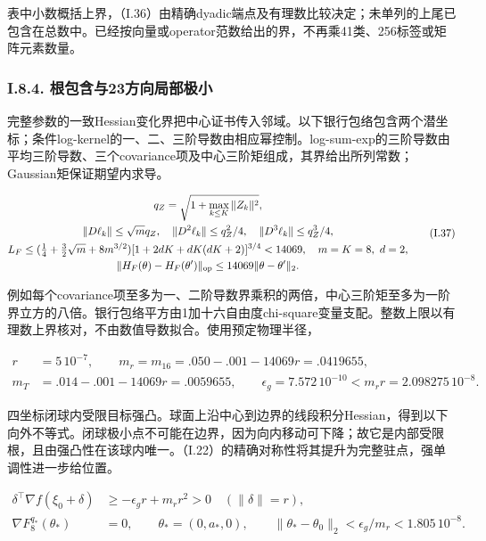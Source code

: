 \documentclass[11pt,a4paper]{article}
\begin{document}
表中小数概括上界，（I.36）由精确dyadic端点及有理数比较决定；未单列的上尾已包含在总数中。已经按向量或operator范数给出的界，不再乘41类、256标签或矩阵元素数量。

\subsubsection*{I.8.4.
根包含与23方向局部极小}\label{i.8.4.-ux6839ux5305ux542bux4e0e23ux65b9ux5411ux5c40ux90e8ux6781ux5c0f}

完整参数的一致Hessian变化界把中心证书传入邻域。以下银行包络包含两个潜坐标；条件log-kernel的一、二、三阶导数由相应幂控制。log-sum-exp的三阶导数由平均三阶导数、三个covariance项及中心三阶矩组成，其界给出所列常数；Gaussian矩保证期望内求导。

\[
\begin{gathered}
q_Z=\sqrt{1+\max_{k\le K}\|Z_k\|^2},\\
\|D\ell_k\|\le\sqrt m q_Z,\quad\|D^2\ell_k\|\le q_Z^2/4,\quad\|D^3\ell_k\|\le q_Z^3/4,\\
L_F\le(\tfrac14+\tfrac32\sqrt m+8m^{3/2})
[1+2dK+dK(dK+2)]^{3/4}<14069,\quad m=K=8,\ d=2,\\
\|H_F(\theta)-H_F(\theta')\|_{\rm op}\le14069\|\theta-\theta'\|_2.
\end{gathered}
\tag{I.37}
\]

例如每个covariance项至多为一、二阶导数界乘积的两倍，中心三阶矩至多为一阶界立方的八倍。银行包络平方由1加十六自由度chi-square变量支配。整数上限以有理数上界核对，不由数值导数拟合。使用预定物理半径，

\[
\begin{aligned}
r&=5\,10^{-7},\qquad
m_r=m_{16}=.050-.001-14069r=.0419655,\\
m_T&=.014-.001-14069r=.0059655,\qquad
\epsilon_g=7.572\,10^{-10}<m_rr=2.098275\,10^{-8}.
\end{aligned}
\tag{I.38}
\]

四坐标闭球内受限目标强凸。球面上沿中心到边界的线段积分Hessian，得到以下向外不等式。闭球极小点不可能在边界，因为向内移动可下降；故它是内部受限根，且由强凸性在该球内唯一。（I.22）的精确对称性将其提升为完整驻点，强单调性进一步给位置。

\[
\begin{aligned}
\delta^\top\nabla f(\xi_0+\delta)&\ge-\epsilon_g r+m_rr^2>0\quad(\|\delta\|=r),\\
\nabla F_8^{q_*}(\theta_*)&=0,\qquad\theta_*=(0,a_*,0),\qquad
\|\theta_*-\theta_0\|_2<\epsilon_g/m_r<1.805\,10^{-8}.
\end{aligned}
\tag{I.39}
\]
\end{document}
